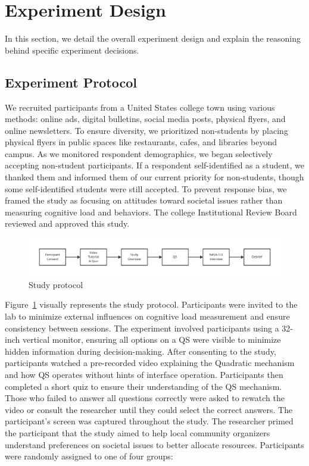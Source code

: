 \section{Experiment Design}
\label{sec:experiment}
In this section, we detail the overall experiment design and explain the reasoning behind specific experiment decisions.

\subsection{Experiment Protocol}
We recruited participants from a United States college town using various methods: online ads, digital bulletins, social media posts, physical flyers, and online newsletters. To ensure diversity, we prioritized non-students by placing physical flyers in public spaces like restaurants, cafes, and libraries beyond campus. As we monitored respondent demographics, we began selectively accepting non-student participants. If a respondent self-identified as a student, we thanked them and informed them of our current priority for non-students, though some self-identified students were still accepted. To prevent response bias, we framed the study as focusing on attitudes toward societal issues rather than measuring cognitive load and behaviors. The college Institutional Review Board reviewed and approved this study.

\begin{figure}[ht]
    \centering
    \includegraphics[width=1\textwidth]{content/image/study_flow.pdf}
    \caption{Study protocol}
    \label{fig:studyProtocol}
\end{figure}

Figure~\ref{fig:studyProtocol} visually represents the study protocol. Participants were invited to the lab to minimize external influences on cognitive load measurement and ensure consistency between sessions. The experiment involved participants using a 32-inch vertical monitor, ensuring all options on a QS were visible to minimize hidden information during decision-making. After consenting to the study, participants watched a pre-recorded video explaining the Quadratic mechanism and how QS operates without hints of interface operation. Participants then completed a short quiz to ensure their understanding of the QS mechanism. Those who failed to answer all questions correctly were asked to rewatch the video or consult the researcher until they could select the correct answers. The participant's screen was captured throughout the study. The researcher primed the participant that the study aimed to help local community organizers understand preferences on societal issues to better allocate resources. Participants were randomly assigned to one of four groups:

